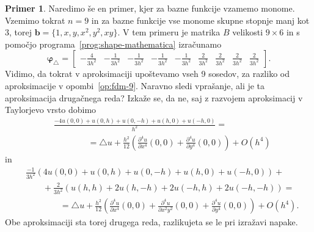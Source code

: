 \documentclass[12pt,a4paper,twoside]{article}
\theoremstyle{definition} %
\newtheorem{primer}[definicija]{Primer}
\theoremstyle{plain} %
\numberwithin{equation}{section}
\newcommand{\lap}{\triangle}
\renewcommand{\b}{\boldsymbol}
\renewcommand{\phi}{\varphi}
\newcommand{\dpar}[2]{\ensuremath{\frac{\partial #1}{\partial #2}}}
\begin{document}
\begin{primer}
  Naredimo še en primer, kjer za bazne funkcije vzamemo monome. Vzemimo tokrat
  $n = 9$ in za bazne funkcije vse monome skupne stopnje manj kot 3, torej $\b b = \{1,
  x, y, x^2, y^2, xy\}$. V tem primeru je matrika $B$ velikosti $9\times 6$ in
  s pomočjo programa~\ref{prog:shape-mathematica} izračunamo
  \begin{equation}
    \b\phi_\lap =
    \begin{bmatrix}
      -\frac{4}{3 h^2} & -\frac{1}{3 h^2} & -\frac{1}{3 h^2} & -\frac{1}{3 h^2} &
      -\frac{1}{3 h^2} & \frac{2}{3 h^2} & \frac{2}{3 h^2} & \frac{2}{3 h^2} &
      \frac{2}{3 h^2}
    \end{bmatrix}.
  \end{equation}
  Vidimo, da tokrat v aproksimaciji upoštevamo vseh 9 sosedov, za razliko od aproksimacije v
  opombi~\ref{op:fdm-9}. Naravno sledi vprašanje, ali je ta aproksimacija drugačnega reda? Izkaže
  se, da ne, saj z razvojem aproksimacij v Taylorjevo vrsto dobimo
  \begin{align}
    &\frac{-4 u(0, 0) + u(0, h) + u(0, -h) + u(h, 0) + u(-h, 0)}{h^2} = \nonumber \\
    & \qquad \qquad = \lap u + \frac{h^2}{12}\left(\dpar{^4u}{x^4}(0, 0) + \dpar{^4u}{y^4}(0, 0)\right) + O(h^4)
  \end{align}
  in
  \begin{align}
    & \frac{-1}{3h^2}(4 u(0, 0) + u(0, h) + u(0, -h) + u(h, 0) + u(-h, 0)) + \phantom{x} \nonumber \\
  & \qquad + \frac{2}{3h^2}(u(h, h) + 2u(h, -h) + 2u(-h, h) + 2u(-h, -h)) = \\
    &\qquad \qquad =
    \lap u + \frac{h^2}{12}\left(\dpar{^4u}{x^4}(0, 0) + \dpar{^4u}{x^2y^2}(0, 0) +
    \dpar{^4u}{y^4}(0, 0)\right) + O(h^4).\nonumber
  \end{align}
  Obe aproksimaciji sta torej drugega reda, razlikujeta se le pri izražavi
  napake.
\end{primer}
\end{document}
